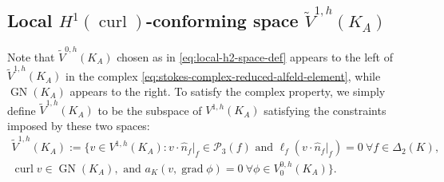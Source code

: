 \documentclass{mcom-l}
\theoremstyle{definition}
\theoremstyle{remark}
\numberwithin{equation}{section}
\newcommand{\unitvec}[1]{\hat{#1}}
\DeclareMathOperator{\GN}{GN}
\DeclareMathOperator{\curl}{curl}
\DeclareMathOperator{\grad}{grad}
\begin{document}
\subsection{Local $H^1(\curl)$-conforming space $\tilde{V}^{1, h}(K_A)$}

Note that $\tilde{V}^{0, h}(K_A)$ chosen as in \cref{eq:local-h2-space-def}
appears to the left of $\tilde{V}^{1, h}(K_A)$ in
the complex \cref{eq:stokes-complex-reduced-alfeld-element}, while
$\GN(K_A)$ appears to the right. To satisfy the complex property,
we simply define $\tilde{V}^{1, h}(K_A)$ to be the subspace of
$V^{1, h}(K_A)$ satisfying the constraints
imposed by these two spaces:
\begin{multline}
	\label{eq:local-h1curl-space-def}
	\tilde{V}^{1, h}(K_A) := \{ 
	v \in V^{1, h}(K_A) : 
	v \cdot \unitvec{n}_f|_{f} \in \mathcal{P}_3(f) 
	\text{ and } \ell_f(v \cdot \unitvec{n}_f|_{f}) = 0
	\ \forall f \in \Delta_2(K), \\
	\curl v \in \GN(K_A), \text{ and }
	a_K(v, \grad \phi) = 0 
	\ \forall \phi \in V^{0, h}_0(K_A)  
	\}.
\end{multline}
\end{document}
